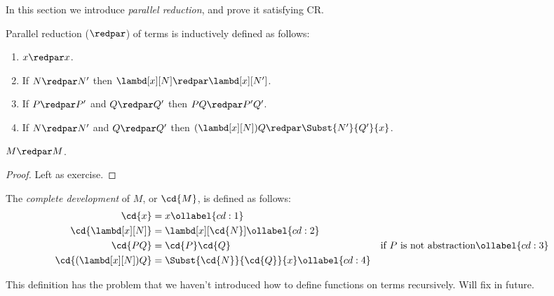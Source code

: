 \documentclass[../../../include/open-logic-section]{subfiles}
\begin{document}


In this section we introduce \emph{parallel reduction}, and prove it
satisfying CR.

\begin{defn}
  Parallel reduction ($\redpar$) of terms is inductively defined as follows:
  \begin{enumerate}
    \item {} $x \redpar x$.
    \item {} If $N \redpar N'$ then $\lambd[x][N] \redpar
      \lambd[x][N']$.
    \item {} If $P \redpar P'$ and $Q \redpar Q'$ then $PQ \redpar
      P'Q'$.
    \item {} If $N \redpar N'$ and $Q \redpar Q'$ then
      $(\lambd[x][N])Q \redpar \Subst{N'}{Q'}{x}$.
  \end{enumerate}
\end{defn}

\begin{thm}
  $M \redpar M$.
\end{thm}
\begin{proof}
  Left as exercise.
\end{proof}

\begin{defn}
  The \emph{complete development} of $M$, or $\cd{M}$, is defined
  as follows:
  \begin{align}
    \cd{x} &= x \ollabel{cd:1} \\
    \cd{\lambd[x][N]} &= \lambd[x][\cd{N}] \ollabel{cd:2}\\
    \cd{PQ} &= \cd{P}\cd{Q} && \text{if $P$ is not abstraction} \ollabel{cd:3} \\
    \cd{(\lambd[x][N])Q} &= \Subst{\cd{N}}{\cd{Q}}{x} \ollabel{cd:4}
  \end{align}
\end{defn}

\begin{editorial}
  This definition has the problem that we haven't introduced how to
  define functions on terms recursively. Will fix in future.
\end{editorial}
\end{document}
